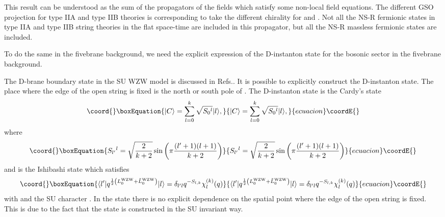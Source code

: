 \documentclass[a4paper,prd,preprint]{revtex4}
\begin{document}
This result can be understood
 as the sum of the propagators of the fields
 which satisfy some non-local field equations.
The different GSO projection for type IIA and type IIB theories
 is corresponding to take the different chirality
 for \coordHE{} and \coordHE{}.
Not all the NS-R fermionic states
 in type IIA and type IIB string theories in the flat space-time
 are included in this propagator,
 but all the NS-R massless fermionic states are included.

To do the same in the fivebrane background,
 we need the explicit expression of the D-instanton state
 for the bosonic sector
 in the fivebrane background.

The D-brane boundary state in the SU\coordHE{} WZW model
 is discussed in Refs.\cite{Alekseev-Schomerus,FFFS}.
It is possible to explicitly construct the D-instanton state.
The place where the edge of the open string is fixed
 is the north or south pole of \coordHE{}.
The D-instanton state is the Cardy's state
\begin{equation}\coord{}\boxEquation{
 | C \rangle = \sum_{l=0}^k \sqrt{S_0{}^l} | l \rangle,
\label{Cardy}
}{
 | C \rangle = \sum_{l=0}^k \sqrt{S_0{}^l} | l \rangle,
}{ecuacion}\coordE{}\end{equation}
 where
\begin{equation}\coord{}\boxEquation{
 S_{l'}{}^l =
  \sqrt{{2 \over {k+2}}}
  \sin \left( \pi {{(l'+1)(l+1)} \over {k+2}} \right)
}{
 S_{l'}{}^l =
  \sqrt{{2 \over {k+2}}}
  \sin \left( \pi {{(l'+1)(l+1)} \over {k+2}} \right)
}{ecuacion}\coordE{}\end{equation}
 and \coordHE{} is the Ishibashi state which satisfies
\begin{equation}\coord{}\boxEquation{
 \langle l' |
  q^{{1 \over 2}
  \left( L_0^{\rm WZW} + {\tilde L}_0^{\rm WZW} \right)}
 | l \rangle
 = \delta_{l'l} q^{-S_{l,k}} \chi^{(k)}_l(q)
}{
 \langle l' |
  q^{{1 \over 2}
  \left( L_0^{\rm WZW} + {\tilde L}_0^{\rm WZW} \right)}
 | l \rangle
 = \delta_{l'l} q^{-S_{l,k}} \chi^{(k)}_l(q)
}{ecuacion}\coordE{}\end{equation}
 with \coordHE{}
 and the SU\coordHE{} character \coordHE{}.
In the state \coordHE{}
 there is no explicit dependence on the spatial point
 where the edge of the open string is fixed.
This is due to the fact that
 the state is constructed in the SU\coordHE{} invariant way.
\end{document}
